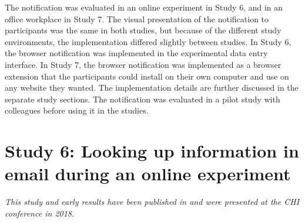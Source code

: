 The notification was evaluated in an online experiment in Study 6, and in an office workplace in Study 7. The visual presentation of the notification to participants was the same in both studies, but because of the different study environments, the implementation differed slightly between studies. In Study 6, the browser notification was implemented in the experimental data entry interface. In Study 7, the browser notification was implemented as a browser extension that the participants could install on their own computer and use on any website they wanted. The implementation details are further discussed in the separate study sections. The notification was evaluated in a pilot study with colleagues before using it in the studies. 

\section{Study 6: Looking up information in email during an online experiment}\label{st:Study6}
\textit{This study and early results have been published in \citet{Borghouts2018a} and were presented at the CHI conference in 2018.}

